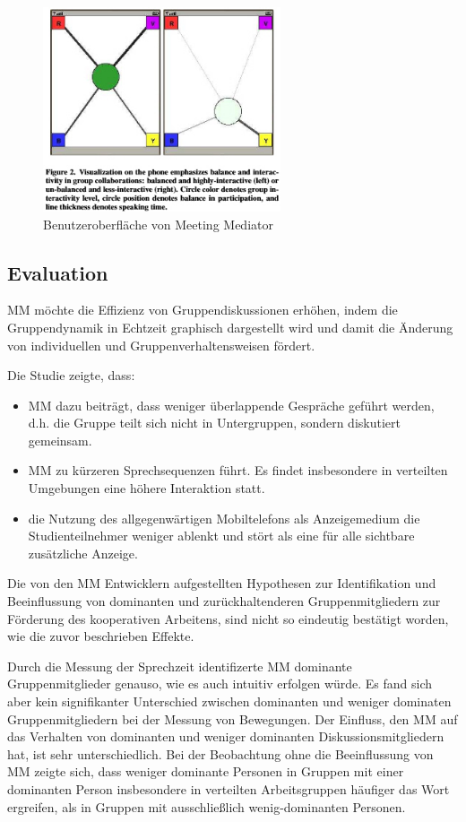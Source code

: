 \begin{figure}[htp] 
\centering 
\includegraphics[width=7cm]{mm.jpg}
\caption{Benutzeroberfläche von Meeting Mediator}
\end{figure}

\subsection{Evaluation}
MM möchte die Effizienz von Gruppendiskussionen erhöhen, indem die
Gruppendynamik in Echtzeit graphisch dargestellt wird und damit die Änderung von
 individuellen und Gruppenverhaltensweisen fördert.
 
Die Studie zeigte, dass:

\begin{itemize}
  \item MM dazu beiträgt, dass weniger überlappende Gespräche geführt werden, d.h. die
Gruppe teilt sich nicht in Untergruppen, sondern diskutiert gemeinsam.
  \item MM zu kürzeren Sprechsequenzen führt. Es findet insbesondere in verteilten
Umgebungen eine höhere Interaktion statt.
  \item die Nutzung des allgegenwärtigen Mobiltelefons als Anzeigemedium die
Studienteilnehmer weniger ablenkt und stört als eine für alle sichtbare
zusätzliche Anzeige.

\end{itemize}

Die von den MM Entwicklern aufgestellten Hypothesen zur Identifikation und
Beeinflussung von dominanten und zurückhaltenderen Gruppenmitgliedern zur
Förderung des kooperativen Arbeitens, sind nicht so eindeutig bestätigt worden,
wie die zuvor beschrieben Effekte.

Durch die Messung der Sprechzeit identifizerte MM dominante Gruppenmitglieder
genauso, wie es auch intuitiv erfolgen würde. Es fand sich aber kein
signifikanter Unterschied zwischen dominanten und weniger dominaten
Gruppenmitgliedern bei der Messung von Bewegungen.
Der Einfluss, den MM auf das Verhalten von dominanten und weniger dominanten
Diskussionsmitgliedern hat, ist sehr unterschiedlich.
Bei der Beobachtung ohne die Beeinflussung von MM zeigte sich, dass weniger
dominante Personen in Gruppen mit einer dominanten Person insbesondere in
verteilten Arbeitsgruppen häufiger das Wort ergreifen, als in Gruppen mit
ausschließlich wenig-do\-min\-ant\-en Personen.

